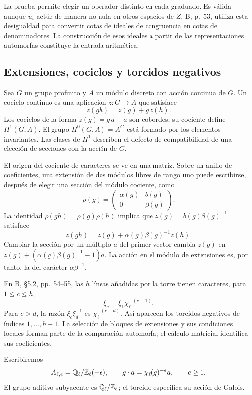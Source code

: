 La prueba permite elegir un operador distinto en cada
graduado. Es válida aunque $u_i$ actúe de manera no nula
en otros espacios de $Z$.
B, p.~53, utiliza esta desigualdad para convertir cotas
de ideales de congruencia en cotas de denominadores.
La construcción de esos ideales a partir de las
representaciones automorfas constituye la entrada aritmética.

\subsection{Extensiones, cociclos y torcidos negativos}

Sea $G$ un grupo profinito y $A$ un módulo discreto
con acción continua de $G$. Un cociclo continuo es
una aplicación $z:G\to A$ que satisface
\begin{equation}
 z(gh)=z(g)+g\,z(h).
 \label{eq:cohom-cociclo}
\end{equation}
Los cociclos de la forma $z(g)=g\,a-a$ son cobordes;
su cociente define $H^1(G,A)$. El grupo
$H^0(G,A)=A^G$ está formado por los elementos invariantes.
Las clases de $H^1$ describen el defecto de compatibilidad
de una elección de secciones con la acción de $G$.

El origen del cociente de caracteres se ve en una matriz.
Sobre un anillo de coeficientes, una extensión de dos
módulos libres de rango uno puede escribirse, después
de elegir una sección del módulo cociente, como
\[
 \rho(g)=
 \begin{pmatrix}\alpha(g)&b(g)\\0&\beta(g)\end{pmatrix}.
\]
La identidad $\rho(gh)=\rho(g)\rho(h)$ implica que
$z(g)=b(g)\beta(g)^{-1}$ satisface
\[
 z(gh)=z(g)+\alpha(g)\beta(g)^{-1}z(h).
\]
Cambiar la sección por un múltiplo $a$ del primer vector
cambia $z(g)$ en
$z(g)+(\alpha(g)\beta(g)^{-1}-1)a$.
La acción en el módulo de extensiones es, por tanto,
la del carácter $\alpha\beta^{-1}$.

En B, §5.2, pp.~54--55, las $h$ líneas añadidas por la torre
tienen caracteres, para $1\le c\le h$,
\[
 \xi_c=\xi_1\chi_\ell^{-(c-1)}.
\]
Para $c>d$, la razón $\xi_c\xi_d^{-1}$ es
$\chi_\ell^{-(c-d)}$. Así aparecen los torcidos negativos
de índices $1,\ldots,h-1$. La selección de bloques de
extensiones y sus condiciones locales forman parte de la
comparación automorfa; el cálculo matricial identifica
sus coeficientes.

Escribiremos
\begin{equation}
 A_{\ell,e}=\mathbb{Q}_\ell/\mathbb{Z}_\ell(-e),\qquad
 g\cdot a=\chi_\ell(g)^{-e}a,\qquad e\ge1.
 \label{eq:cohom-torcido}
\end{equation}
El grupo aditivo subyacente es $\mathbb{Q}_\ell/\mathbb{Z}_\ell$;
el torcido especifica su acción de Galois.

